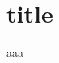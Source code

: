 \documentclass{beamer}
\begin{document}
\begin{frame}
\tableofcontents
\end{frame}

\section{title}

\begin{frame}
 aaa
\end{frame}
\end{document}
